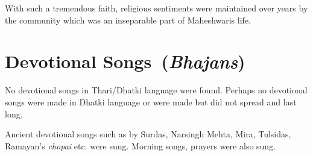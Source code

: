 With such a tremendous faith, religious sentiments were maintained over years
by the community which was an inseparable part of Maheshwaris life.

\section{Devotional Songs~(\textit{Bhajans})}
No devotional songs in Thari/Dhatki language were found. Perhaps no devotional
songs were made in Dhatki language or were made but did not spread and last
long.

Ancient devotional songs such as by Surdas, Narsingh Mehta, Mira, Tulsidas,
Ramayan's \textit{chopai} etc. were sung. Morning songs, prayers were also
sung.

